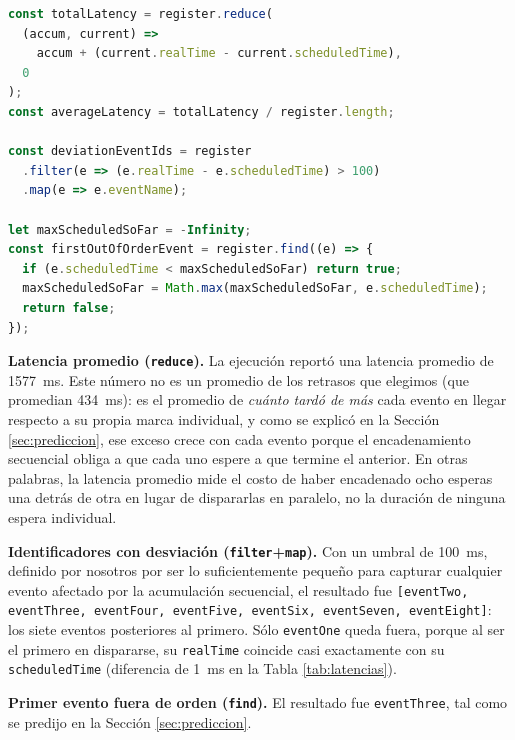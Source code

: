 \documentclass[conference,a4paper]{IEEEtran}
\begin{document}
\begin{lstlisting}[language=JavaScript, caption={Post-procesamiento funcional compartido (ProcessResults.js, resumido).}, label={lst:procesar}]
const totalLatency = register.reduce(
  (accum, current) =>
    accum + (current.realTime - current.scheduledTime),
  0
);
const averageLatency = totalLatency / register.length;

const deviationEventIds = register
  .filter(e => (e.realTime - e.scheduledTime) > 100)
  .map(e => e.eventName);

let maxScheduledSoFar = -Infinity;
const firstOutOfOrderEvent = register.find((e) => {
  if (e.scheduledTime < maxScheduledSoFar) return true;
  maxScheduledSoFar = Math.max(maxScheduledSoFar, e.scheduledTime);
  return false;
});
\end{lstlisting}

\textbf{Latencia promedio (\texttt{reduce}).} La ejecuci\'on report\'o una latencia promedio de 1577~ms. Este n\'umero no es un promedio de los retrasos que elegimos (que promedian 434~ms): es el promedio de \emph{cu\'anto tard\'o de m\'as} cada evento en llegar respecto a su propia marca individual, y como se explic\'o en la Secci\'on \ref{sec:prediccion}, ese exceso crece con cada evento porque el encadenamiento secuencial obliga a que cada uno espere a que termine el anterior. En otras palabras, la latencia promedio mide el costo de haber encadenado ocho esperas una detr\'as de otra en lugar de dispararlas en paralelo, no la duraci\'on de ninguna espera individual.

\textbf{Identificadores con desviaci\'on (\texttt{filter}+\texttt{map}).} Con un umbral de 100~ms, definido por nosotros por ser lo suficientemente peque\~no para capturar cualquier evento afectado por la acumulaci\'on secuencial, el resultado fue \texttt{[eventTwo, eventThree, eventFour, eventFive, eventSix, eventSeven, eventEight]}: los siete eventos posteriores al primero. S\'olo \texttt{eventOne} queda fuera, porque al ser el primero en dispararse, su \texttt{realTime} coincide casi exactamente con su \texttt{scheduledTime} (diferencia de 1~ms en la Tabla \ref{tab:latencias}).

\textbf{Primer evento fuera de orden (\texttt{find}).} El resultado fue \texttt{eventThree}, tal como se predijo en la Secci\'on \ref{sec:prediccion}.
\end{document}
